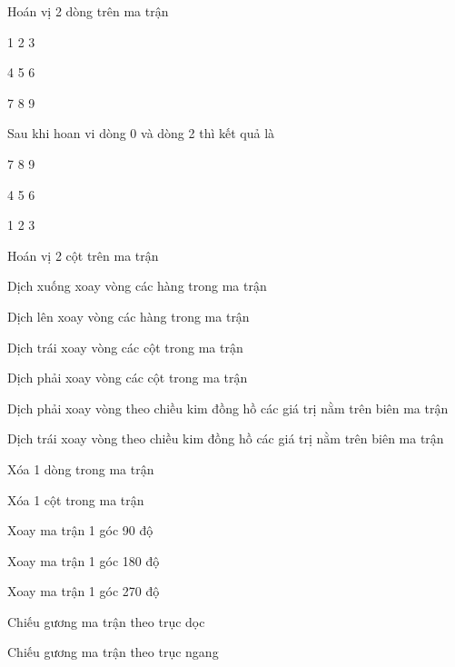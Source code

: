 \begin{problem}
    Hoán vị 2 dòng trên ma trận

1 2 3

4 5 6

7 8 9

Sau khi hoan vi dòng 0 và dòng 2 thì kết quả là

7 8 9 

4 5 6

1 2 3
\end{problem}
\begin{problem}
    Hoán vị 2 cột trên ma trận
\end{problem}
\begin{problem}
    Dịch xuống xoay vòng các hàng trong ma trận
\end{problem}
\begin{problem}
    Dịch lên xoay vòng các hàng trong ma trận
\end{problem}
\begin{problem}
    Dịch trái xoay vòng các cột trong ma trận
\end{problem}
\begin{problem}
    Dịch phải xoay vòng các cột trong ma trận
\end{problem}
\begin{problem}
    Dịch phải xoay vòng theo chiều kim đồng hồ các giá trị nằm trên biên ma trận
\end{problem}
\begin{problem}
    Dịch trái xoay vòng theo chiều kim đồng hồ các giá trị nằm trên biên ma trận
\end{problem}
\begin{problem}
    Xóa 1 dòng trong ma trận
\end{problem}
\begin{problem}
    Xóa 1 cột trong ma trận
\end{problem}
\begin{problem}
    Xoay ma trận 1 góc 90 độ
\end{problem}
\begin{problem}
    Xoay ma trận 1 góc 180 độ
\end{problem}
\begin{problem}
    Xoay ma trận 1 góc 270 độ
\end{problem}
\begin{problem}
    Chiếu gương ma trận theo trục dọc
\end{problem}
\begin{problem}
    Chiếu gương ma trận theo trục ngang
\end{problem}


